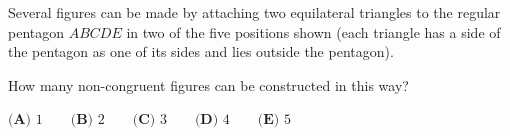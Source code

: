 Several figures can be made by attaching two equilateral triangles to the regular pentagon $ABCDE$ in two of the five positions shown (each triangle has a side of the pentagon as one of its sides and lies outside the pentagon).


How many non-congruent figures can be constructed in this way?

$\textbf{(A) }1\qquad\textbf{(B) }2\qquad\textbf{(C) }3\qquad\textbf{(D) }4\qquad\textbf{(E) }5$
